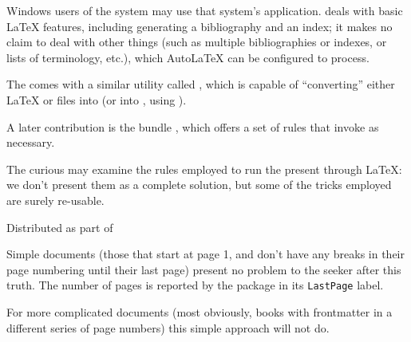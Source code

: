 Windows users of the \miktex{} system may use that system's
 application.   deals with basic
\LaTeX{} features, including generating a bibliography and an index;
it makes no claim to deal with other things (such as multiple
bibliographies or indexes, or lists of terminology, etc.), which
Auto\LaTeX{} can be configured to process.

The  comes with a similar
utility called , which is capable of ``converting''
either \LaTeX{} or  files into  (or into
, using \PDFTeX{}).

A later contribution is the bundle , which
offers a set of  rules that invoke 
as necessary.

The curious may examine the rules employed to run the present
 through \LaTeX{}: we don't present them as a complete
solution, but some of the tricks employed are surely re-usable.
\begin{ctanrefs}
\item[\nothtml{\rmfamily}arara]
\item[\nothtml{\rmfamily}AutoLaTeX]
\item[\nothtml{\rmfamily}\acro{FAQ} distribution]
\item[\nothtml{\rmfamily}latexmake]
\item[latex-make]
\item[latex\_make]
\item[latexmk]
\item[texi2dvi]Distributed as part of 
\item[try]
\item[vpp]
\end{ctanrefs}


Simple documents (those that start at page 1, and don't have any
breaks in their page numbering until their last page) present no
problem to the seeker after this truth.  The number of pages is
reported by the  package in its \texttt{LastPage} label.

For more complicated documents (most obviously, books with frontmatter
in a different series of page numbers) this simple approach will not
do.

